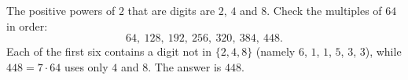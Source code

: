 The positive powers of $2$ that are digits are $2$, $4$ and $8$. Check the multiples of $64$ in order:
\[
64,\ 128,\ 192,\ 256,\ 320,\ 384,\ 448 .
\]
Each of the first six contains a digit not in $\{2,4,8\}$ (namely $6$, $1$, $1$, $5$, $3$, $3$), while $448=7\cdot64$ uses only $4$ and $8$. The answer is $\boxed{448}$.
